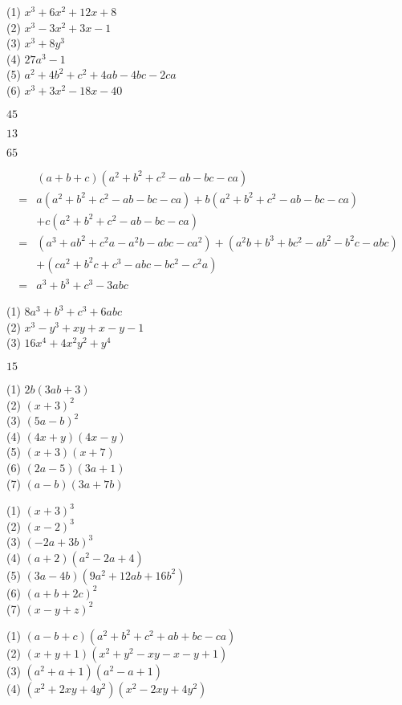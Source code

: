 \documentclass{oblivoir}
\begin{document}
%
(1) \(x^3+6x^2+12x+8\)\\
(2) \(x^3-3x^2+3x-1\)\\
(3) \(x^3+8y^3\)\\
(4) \(27a^3-1\)\\
(5) \(a^2+4b^2+c^2+4ab-4bc-2ca\)\\
(6) \(x^3+3x^2-18x-40\)

%
\(45\)

%
\(13\)

%
\(65\)

\clearpage
%
\vspace{-20pt}
\begin{align*}
&(a+b+c)(a^2+b^2+c^2-ab-bc-ca)\\
=&a(a^2+b^2+c^2-ab-bc-ca)+b(a^2+b^2+c^2-ab-bc-ca)\\
&+c(a^2+b^2+c^2-ab-bc-ca)\\
=&(a^3+ab^2+c^2a-a^2b-abc-ca^2)+(a^2b+b^3+bc^2-ab^2-b^2c-abc)\\
&+(ca^2+b^2c+c^3-abc-bc^2-c^2a)\\
=&a^3+b^3+c^3-3abc
\end{align*}

\begin{minipage}{0.49\textwidth}
%
(1) \(8a^3+b^3+c^3+6abc\)\\
(2) \(x^3-y^3+xy+x-y-1\)\\
(3) \(16x^4+4x^2y^2+y^4\)

%
\(15\)

%
(1) \(2b(3ab+3)\)\\
(2) \((x+3)^2\)\\
(3) \((5a-b)^2\)\\
(4) \((4x+y)(4x-y)\)\\
(5) \((x+3)(x+7)\)\\
(6) \((2a-5)(3a+1)\)\\
(7) \((a-b)(3a+7b)\)

\end{minipage}
\begin{minipage}{0.49\textwidth}

%
(1) \((x+3)^3\)\\
(2) \((x-2)^3\)\\
(3) \((-2a+3b)^3\)\\
(4) \((a+2)(a^2-2a+4)\)\\
(5) \((3a-4b)(9a^2+12ab+16b^2)\)\\
(6) \((a+b+2c)^2\)\\
(7) \((x-y+z)^2\)

%
(1) \((a-b+c)(a^2+b^2+c^2+ab+bc-ca)\)\\
(2) \((x+y+1)(x^2+y^2-xy-x-y+1)\)\\
(3) \((a^2+a+1)(a^2-a+1)\)\\
(4) \((x^2+2xy+4y^2)(x^2-2xy+4y^2)\)
\end{minipage}
\end{document}
